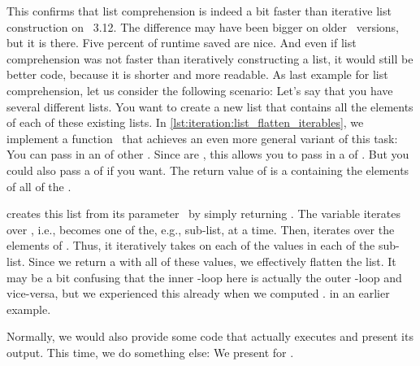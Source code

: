 This confirms that list comprehension is indeed a bit faster than iterative list construction on \python~3.12.
The difference may have been bigger on older \python\ versions, but it is there.
Five percent of runtime saved are nice.
And even if list comprehension was not faster than iteratively constructing a list, it would still be better code, because it is shorter and more readable.%
%
\FloatBarrier%
\endhsection%
%
%
%
%
%
%
%
%
As last example for list comprehension, let us consider the following scenario:
Let's say that you have several different lists.
You want to create a new list that contains all the elements of each of these existing lists.
In \cref{lst:iteration:list_flatten_iterables}, we implement a function~ that achieves an even more general variant of this task:
You can pass in an  of other .
Since  are , this allows you to pass in a  of .
But you could also pass a  of  if you want.
The return value of  is a  containing the elements of all of the  .%
%
\begin{sloppypar}%
 creates this list from its parameter~ by simply returning .
The variable  iterates over , i.e., becomes one of the, e.g., sub-list, at a time.
Then,  iterates over the elements of .
Thus, it iteratively takes on each of the values in each of the sub-list.
Since we return a  with all of these values, we effectively flatten the list.
It may be a bit confusing that the inner -loop here is actually the outer -loop and vice-versa, but we experienced this already when we computed . in an earlier example.%
\end{sloppypar}%
%
Normally, we would also provide some code that actually executes  and present its output.
This time, we do something else:
We present  for .

